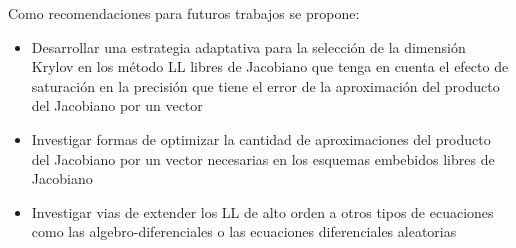 \begin{recomendations}

Como recomendaciones para futuros trabajos se propone:
\begin{itemize}
	\item Desarrollar una estrategia adaptativa para la selección de la dimensión Krylov en los método LL libres de Jacobiano que tenga en cuenta el efecto de saturación en la precisión que tiene el error de la aproximación del producto del Jacobiano por un vector
	\item Investigar formas de optimizar la cantidad de aproximaciones del producto del Jacobiano por un vector necesarias en los esquemas embebidos libres de Jacobiano
	\item Investigar vias de extender los LL de alto orden a otros tipos de ecuaciones como las algebro-diferenciales o las ecuaciones diferenciales aleatorias
\end{itemize}

\end{recomendations}
